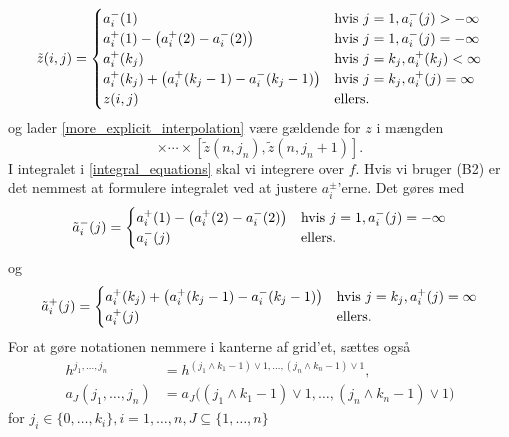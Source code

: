 \documentclass[a4paper, 12pt]{memoir}
\begin{document}
\begin{align}
\tilde z(i,j) =\begin{cases} a_i^-(1)\quad &\textup{hvis } j=1, a_i^-(j)>-\infty\\
a_i^+(1)-\bigl(a_i^+(2)-a_i^-(2)\bigr)&\textup{hvis } j=1, a_i^-(j)=-\infty\\
a_i^+(k_j)\quad &\textup{hvis } j=k_j, a_i^+(k_j)<\infty\\
a_i^+(k_j)+\bigl(a_i^+(k_j-1)-a_i^-(k_j-1)\bigr)&\textup{hvis } j=k_j, a_i^+(j)=\infty\\
z(i,j) & \textup{ellers.}
\end{cases}
\end{align}
og lader \eqref{more_explicit_interpolation} være gældende for $z$ i mængden
\begin{equation*}
[\tilde z(1,j_1), \tilde z(1,j_1+1)]\times \cdots \times [\tilde z(n,j_n), \tilde z(n,j_n+1)].
\end{equation*}
I integralet i \eqref{integral_equations} skal vi integrere over $f$. Hvis vi bruger (B2) er det nemmest at formulere integralet ved at justere $a_i^{\pm}$'erne. Det gøres med
\begin{align*}
\tilde a_i^-(j) =\begin{cases} 
a_i^+(1)-\bigl(a_i^+(2)-a_i^-(2)\bigr)&\textup{hvis } j=1, a_i^-(j)=-\infty\\
a_i^-(j) & \textup{ellers.}
\end{cases}
\end{align*}
og
\begin{align*}
\tilde a_i^+(j) =\begin{cases} 
a_i^+(k_j)+\bigl(a_i^+(k_j-1)-a_i^-(k_j-1)\bigr)&\textup{hvis } j=k_j, a_i^+(j)=\infty\\
a_i^+(j) & \textup{ellers.}
\end{cases}
\end{align*}
For at gøre notationen nemmere i kanterne af grid'et, sættes også
\begin{align}
h^{j_1, \dots, j_n}&=h^{(j_1 \wedge k_1-1)\vee 1, \dots, (j_n \wedge k_n-1)\vee 1},\\
a_J({j_1, \dots, j_n})&=a_J\bigl((j_1 \wedge k_1-1)\vee 1, \dots, (j_n \wedge k_n-1)\vee 1\bigr)
\end{align}
for $ j_i\in \{0, \dots, k_i\}, i=1, \dots, n, J\subseteq \{1, \dots, n\}$
\end{document}
